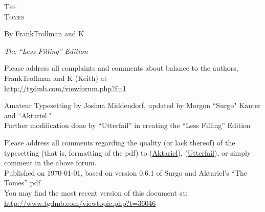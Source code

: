 \pagestyle{plain}

\begin{center} \Huge

\textsc{The\\
Tomes\\
}\end{center}



\vspace{2cm}
\begin{center}\large By FrankTrollman and K\end{center}
\vspace{.5cm}
\begin{center}\normalsize \textit{The ``Less Filling'' Edition}\end{center}


\newpage

\vspace*{4in}

\noindent Please address all complaints and comments about balance to the authors, FrankTrollman and K (Keith) at\\
{\color{blue} \href{http://tgdmb.com/viewforum.php?f=1}{http://tgdmb.com/viewforum.php?f=1}}

\vspace{0.2in}



\noindent Amateur Typesetting by Joshua Middendorf, updated by Morgon ``Surgo" Kanter and ``Aktariel."\\
\noindent Further modification done by ``Utterfail'' in creating the ``Less Filling'' Edition\\

\vspace{0.15in}

\noindent Please address all comments regarding the quality (or lack thereof) of the typesetting (that is, formatting of the pdf) to (\href{mailto:aktariel@gmail.com}{Aktariel}), (\href{mailto:lordoftheutterfail@gmail.com}{Utterfail}), or simply comment in the above forum.\\





\vspace{1in}
\noindent Published on \today, based on version 0.6.1 of Surgo and Aktariel's ``The Tomes'' pdf \\
\noindent You may find the most recent version of this document at:\\
{\color{blue} \href{http://www.tgdmb.com/viewtopic.php?t=36046}{http://www.tgdmb.com/viewtopic.php?t=36046}}

\newpage
